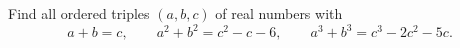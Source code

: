 Find all ordered triples $(a,b,c)$ of real numbers with
\[a+b=c,\qquad a^2+b^2=c^2-c-6,\qquad a^3+b^3=c^3-2c^2-5c.\]
